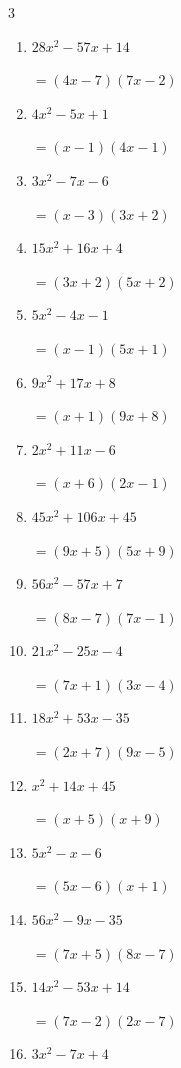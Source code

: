 \begin{multicols}{3}
\begin{enumerate}
  \item $28x^{2}-57x+14$

        $=(4x-7)(7x-2)$

  \item $4x^{2}-5x+1$

        $=(x-1)(4x-1)$

  \item $3x^{2}-7x-6$

        $=(x-3)(3x+2)$

  \item $15x^{2}+16x+4$

        $=(3x+2)(5x+2)$

  \item $5x^{2}-4x-1$

        $=(x-1)(5x+1)$

  \item $9x^{2}+17x+8$

        $=(x+1)(9x+8)$

\columnbreak %

  \item $2x^{2}+11x-6$

        $=(x+6)(2x-1)$

  \item $45x^{2}+106x+45$

        $=(9x+5)(5x+9)$

  \item $56x^{2}-57x+7$

        $=(8x-7)(7x-1)$

  \item $21x^{2}-25x-4$

        $=(7x+1)(3x-4)$

  \item $18x^{2}+53x-35$

        $=(2x+7)(9x-5)$

  \item $x^{2}+14x+45$

        $=(x+5)(x+9)$

  \item $5x^{2}-x-6$

        $=(5x-6)(x+1)$

  \item $56x^{2}-9x-35$

        $=(7x+5)(8x-7)$

  \item $14x^{2}-53x+14$

        $=(7x-2)(2x-7)$

  \item $3x^{2}-7x+4$


\end{enumerate}
\end{multicols}
